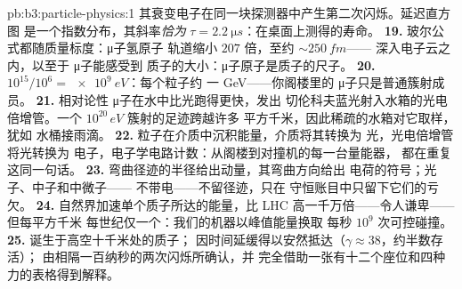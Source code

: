 \begin{solution}{pb:b3:particle-physics:1}
其衰变电子在同一块探测器中产生第二次闪烁。延迟直方图
是一个指数分布，其斜率\emph{恰为}
$\tau = \qty{2.2}{\micro s}$：在桌面上测得的寿命。
\textbf{19.} 玻尔公式都随质量标度：μ子氢原子
轨道缩小 $207$ 倍，至约 ${\sim}\qty{250}{fm}$——
深入电子云之内，以至于 μ子能感受到
质子的大小：μ子原子是质子的尺子。
\textbf{20.} $10^{15}/10^{6} = \qty{e9}{eV}$：每个粒子约
一 GeV——你阁楼里的 μ子只是普通簇射成员。
\textbf{21.} 相对论性 μ子在水中比光跑得更快，发出
切伦科夫蓝光射入水箱的光电倍增管。一个
$10^{20}\,\unit{eV}$ 簇射的足迹跨越许多
平方千米，因此稀疏的水箱对它取样，犹如
水桶接雨滴。
\textbf{22.} 粒子在介质中沉积能量，介质将其转换为
光，光电倍增管将光转换为
电子，电子学电路计数：从阁楼到对撞机的每一台量能器，
都在重复这同一句话。
\textbf{23.} 弯曲径迹的半径给出动量，其弯曲方向给出
电荷的符号；光子、中子和中微子——
不带电——不留径迹，只在
守恒账目中只留下它们的亏欠。
\textbf{24.} 自然界加速单个质子所达的能量，比
LHC 高一千万倍——令人谦卑——但每平方千米
每世纪仅一个：我们的机器以峰值能量换取
每秒 $10^{9}$ 次可控碰撞。
\textbf{25.} 诞生于高空十千米处的质子；
因时间延缓得以安然抵达（$\gamma \approx 38$，约半数存活）；
由相隔一百纳秒的两次闪烁所确认，并
完全借助一张有十二个座位和四种
力的表格得到解释。
\end{solution}
